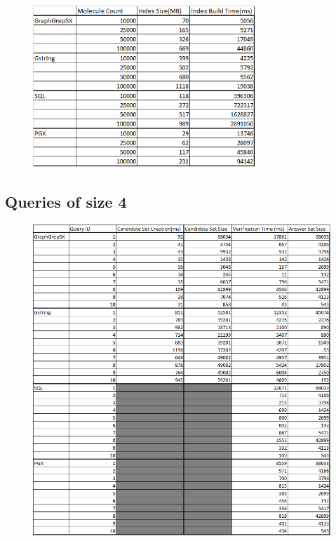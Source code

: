 \documentclass[12pt,a4paper]{report}
\begin{document}
\begin{figure}[h]
	\centering
	\includegraphics[width=0.75\textwidth]{../img/indexBuilding.png}
\end{figure}

\newpage
\subsection*{Queries of size 4}

\begin{figure}[h]
	\centering
	\includegraphics[width=1\textwidth]{../img/q4.png}
\end{figure}
\end{document}
